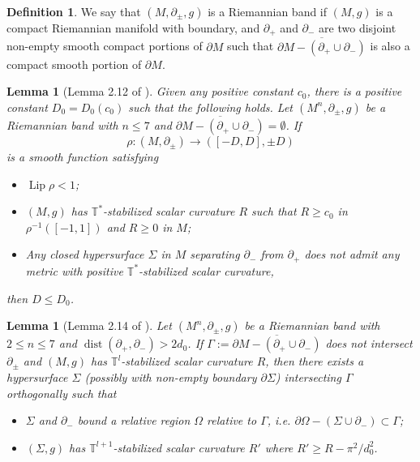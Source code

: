 \documentclass[11pt, reqno]{amsart}
\numberwithin{equation}{section}
\newtheorem{lemma}[theorem]{Lemma}
\theoremstyle{definition}
\newtheorem{definition}[theorem]{Definition}
\DeclareMathOperator{\Lip}{Lip}
\DeclareMathOperator{\dist}{dist}
\newcommand{\de}{\partial}
\begin{document}
\begin{definition}
We say that $(M,\partial_\pm,g)$ is a Riemannian band if $(M,g)$ is a compact Riemannian manifold with boundary, and $\partial_+$ and $\partial_-$ are two disjoint non-empty smooth compact portions of $\partial M$ such that $\overline{\partial M-(\partial_+\cup \partial_-)}$ is also a compact smooth portion of $\partial M$.
\end{definition}

\begin{lemma}[Lemma 2.12 of \cite{SWWZ24}]\label{Lem: D estimate}
Given any positive constant $c_0$, there is a positive constant $D_{0}=D_0(c_0)$ such that the following holds.
Let $(M^{n},\partial_\pm,g)$ be a Riemannian band with $n\leq7$ and $\overline{\partial M-(\partial_+\cup\partial_-)}=\emptyset$. If
\[
\rho: (M,\de_{\pm}) \to ([-D,D],\pm D)
\]
is a smooth function satisfying
\begin{itemize}\setlength{\itemsep}{1mm}
\item $\Lip\rho<1$;
\item $(M,g)$ has $\mathbb T^*$-stabilized scalar curvature $R$ such that $R\geq c_{0}$ in $\rho^{-1}([-1,1])$ and $R\geq0$ in $M$;
\item Any closed hypersurface $\Sigma$ in $M$ separating $\de_{-}$ from $\de_{+}$ does not admit any metric with positive $\mathbb{T}^{*}$-stabilized scalar curvature,
\end{itemize}
then $D\leq D_{0}$.
\end{lemma}


\begin{lemma}[Lemma 2.14 of \cite{CCZ23}]\label{Lem: free boundary}
Let $(M^{n},\partial_\pm,g)$ be a Riemannian band with $2\leq n\leq 7$ and $\dist(\partial_+,\partial_-)>2d_0$. If $\Gamma:=\overline{\partial M-(\partial_+\cup\partial_-)}$ does not intersect $\de_{\pm}$ and $(M,g)$ has $\mathbb T^l$-stabilized scalar curvature $R$, then there exists a hypersurface $\Sigma$ (possibly with non-empty boundary $\partial\Sigma$) intersecting $\Gamma$ orthogonally such that
\begin{itemize}\setlength{\itemsep}{1mm}
\item $\Sigma$ and $\partial_-$ bound a relative region $\Omega$ relative to $\Gamma$, i.e. $\partial\Omega-(\Sigma\cup \partial_-)\subset \Gamma$;
\item $(\Sigma,g)$ has $\mathbb T^{l+1}$-stabilized scalar curvature $R'$ where $R'\geq R-\pi^2/d_0^2$.
\end{itemize}
\end{lemma}
\end{document}
